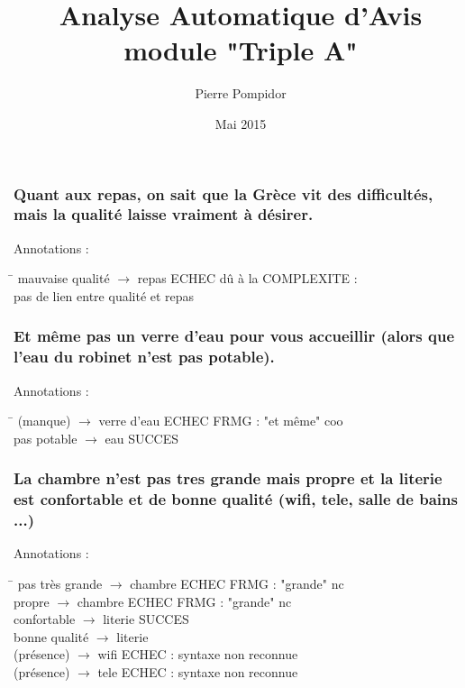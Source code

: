 \documentclass[smaller]{beamer}
\title[Triple A]{Analyse Automatique d'Avis\\module "Triple A"}
\subtitle
{}
\author[P. Pompidor]
{Pierre Pompidor}
\institute[UM]
{
LIRMM - Advanse}
\date[11/05/2016]
{Mai 2015}
\begin{document}
\begin{frame}
\frametitle{Quant aux repas, on sait que la Grèce vit des difficultés, mais la qualité laisse vraiment à désirer.}
\begin{block}{Annotations :}
\begin{tabbing}
\hspace{5cm}\=\kill
mauvaise qualité $\rightarrow$ repas     \> ECHEC dû à la COMPLEXITE :\\
                                         \> pas de lien entre qualité et repas
\end{tabbing}
\end{block}
\end{frame}


\begin{frame}
\frametitle{Et même pas un verre d'eau pour vous accueillir (alors que l'eau du robinet n'est pas potable).}
\begin{block}{Annotations :}
\begin{tabbing}
\hspace{6cm}\=\kill
(manque) $\rightarrow$ verre d'eau         \> ECHEC FRMG : "et même" coo\\
pas potable $\rightarrow$ eau              \> SUCCES
\end{tabbing}
\end{block}
\end{frame}


\begin{frame}
\frametitle{La chambre n'est pas tres grande mais propre et la literie est confortable et de bonne qualité (wifi, tele, salle de bains ...)}
\begin{block}{Annotations :}
\begin{tabbing}
\hspace{6cm}\=\kill
pas très grande $\rightarrow$ chambre      \> ECHEC FRMG : "grande" nc\\
propre $\rightarrow$ chambre               \> ECHEC FRMG : "grande" nc\\
confortable $\rightarrow$ literie          \> SUCCES\\
bonne qualité $\rightarrow$ literie\\
(présence) $\rightarrow$ wifi              \> ECHEC : syntaxe non reconnue\\
(présence) $\rightarrow$ tele              \> ECHEC : syntaxe non reconnue
\end{tabbing}
\end{block}
\end{frame}
\end{document}
